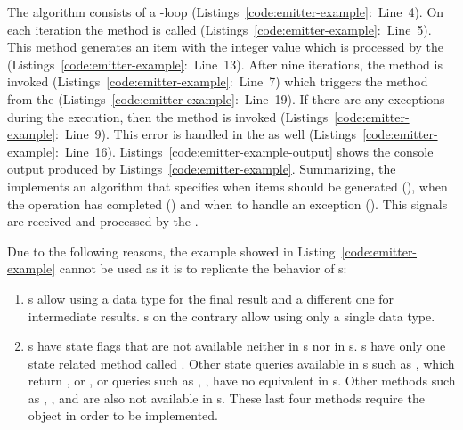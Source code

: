\documentclass[type=bsc,accentcolor=tud9c]{tudthesis}
\begin{document}
The algorithm consists of a -loop (Listings~\ref{code:emitter-example}:~Line~4). On each iteration the method  is called (Listings~\ref{code:emitter-example}:~Line~5). This method generates an item with the integer value  which is processed by the  (Listings~\ref{code:emitter-example}:~Line~13). After nine iterations, the method  is invoked (Listings~\ref{code:emitter-example}:~Line~7) which triggers the  method from the  (Listings~\ref{code:emitter-example}:~Line~19). If there are any exceptions during the execution, then the  method is invoked (Listings~\ref{code:emitter-example}:~Line~9). This error is handled in the  as well (Listings~\ref{code:emitter-example}:~Line~16). Listings~\ref{code:emitter-example-output} shows the console output produced by Listings~\ref{code:emitter-example}. Summarizing, the  implements an algorithm that specifies when items should be generated (), when the operation has completed () and when to handle an exception (). This signals are received and processed by the .

Due to the following reasons, the example showed in Listing~\ref{code:emitter-example} cannot be used as it is to replicate the behavior of s: 
\begin{enumerate}
	\item {}s allow using a data type for the final result and a different one for intermediate results. s on the contrary allow using only a single data type.
	\item {}s have state flags that are not available neither in s nor in s. s have only one state related method called . Other state queries available in s such as , which return ,  or , or queries such as , ,  have no equivalent in s. Other methods such as , ,  and  are also not available in s. These last four methods require the object  in order to be implemented.
\end{enumerate}
\end{document}
